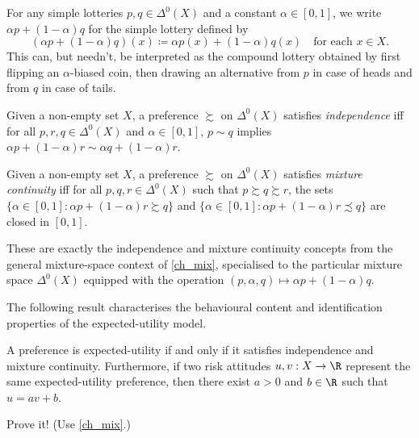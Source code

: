 For any simple lotteries $p,q \in \Delta^0(X)$ and a constant $\alpha \in [0,1]$, we write $\alpha p + (1-\alpha) q$ for the simple lottery defined by
%
\begin{equation*}
	(\alpha p + (1-\alpha) q)(x) \coloneqq \alpha p(x) + (1-\alpha) q(x)
	\quad \text{for each $x \in X$.}
\end{equation*}
%
This can, but needn't, be interpreted as the compound lottery obtained by first flipping an $\alpha$-biased coin, then drawing an alternative from $p$ in case of heads and from $q$ in case of tails.

\begin{definition}
	\label{definition:vnm_indep}
	Given a non-empty set $X$, a preference $\succsim$ on $\Delta^0(X)$ satisfies \emph{independence} iff for all $p,r,q \in \Delta^0(X)$ and $\alpha \in [0,1]$, $p \sim q$ implies $\alpha p + (1-\alpha) r \sim \alpha q + (1-\alpha) r$.
\end{definition}

\begin{definition}
	\label{definition:vnm_continuity}
	Given a non-empty set $X$, a preference $\succsim$ on $\Delta^0(X)$ satisfies \emph{mixture continuity} iff for all $p,q,r \in \Delta^0(X)$ such that $p \succsim q \succsim r$, the sets $\{ \alpha \in [0,1] : \alpha p + (1-\alpha) r \succsim q \}$ and $\{ \alpha \in [0,1] : \alpha p + (1-\alpha) r \precsim q \}$ are closed in $[0,1]$.
\end{definition}

These are exactly the independence and mixture continuity concepts from the general mixture-space context of \cref{ch_mix}, specialised to the particular mixture space $\Delta^0(X)$ equipped with the operation $(p,\alpha,q) \mapsto \alpha p + (1-\alpha) q$.

The following result characterises the behavioural content and identification properties of the expected-utility model.

\begin{namedthm}
	\label{theorem:vNM}
	A preference is expected-utility if and only if it satisfies independence and mixture continuity. Furthermore, if two risk attitudes $u,v : X \to \R$ represent the same expected-utility preference, then there exist $a>0$ and $b \in \R$ such that $u = a v + b$.
\end{namedthm}

\begin{exercise}
	\label{exercise:vNM_proof}
	Prove it! (Use \cref{ch_mix}.)
\end{exercise}

